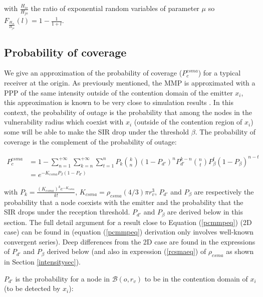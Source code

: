 \documentclass{sig-alternate-05-2015}
\begin{document}
with $\frac{H_{io}}{H_{jo}}$ the ratio of exponential random variables of parameter $\mu$ so $F_{\frac{H_{io}}{H_{jo}}}(l)=1-\frac{1}{1+l}$.

\subsection{Probability of coverage}

We give an approximation of the probability of coverage ($P_{c}^{csma}$) for a typical receiver at the origin. As previously mentioned, the MMP is approximated with a PPP of the same intensity outside of the contention domain of the emitter $x_i$, this approximation is known to be very close to simulation results \cite{haenggi11}. In this context, the probability of outage is the probability that among the nodes in the vulnerability radius which coexist with $x_i$ (outside of the contention region of $x_i$) some will be able to make the SIR drop under the threshold $\beta$. The probability of coverage is the complement of the probability of outage:

\begin{align}
 \label{pcmmpeq}
 P_{c}^{csma}& =1-\sum \limits_{n=1}^{+\infty} \sum \limits_{k=n}^{+\infty} \sum \limits_{t=1}^{n} P_k \binom{k}{n} (1-P_{d'})^n P_{d'}^{k-n} \binom{n}{t} P_{\beta}^t (1-P_{\beta})^{n-t} \nonumber\\
& = e^{-K_{csma}P_{\beta}(1-P_{d'})}
\end{align}

with $P_k=\frac{(K_{csma})^k e^{-K_{csma}}}{k!}$, $K_{csma}=\rho_{csma}(4/3)\pi r^3_v$, $P_{d'}$ and $P_{\beta}$ are respectively the probability that a node coexists with the emitter and the probability that the SIR drops under the reception threshold. $P_{d'}$ and $P_{\beta}$ are derived below in this section. The full detail argument for a result close to Equation (\ref{pcmmpeq}) (2D case) can be found in \cite{elsawy13} (equation (\ref{pcmmpeq}) derivation only involves well-known convergent series). Deep differences from the 2D case are found in the expressions of $P_{d'}$ and $P_{\beta}$ derived below (and also in expression (\ref{rcsmaeq}) of $\rho_{csma}$ as shown in Section \ref{intensitysec}). 

$P_{d'}$ is the probability for a node in $\mathcal{B}(o,r_v)$ to be in the contention domain of $x_i$ (to be detected by $x_i$):
\end{document}
